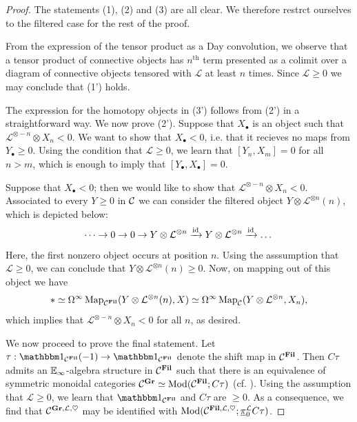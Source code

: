 %

\begin{proof}
  The statements (1), (2) and (3) are all clear. We therefore restrct ourselves to the filtered case for the rest of the proof.

  From the expression of the tensor product as a Day convolution, we observe that a tensor product of connective objects has $n^{\mathrm{th}}$ term presented as a colimit over a diagram of connective objects tensored with $\mathcal{L}$ at least $n$ times. Since $\mathcal{L} \geq 0$ we may conclude that (1') holds.

  The expression for the homotopy objects in (3') follows from (2') in a straightforward way.
  We now prove (2').
  Suppose that $X_\bullet$ is an object such that $\mathcal{L}^{\otimes -n} \otimes X_n < 0$.
  We want to show that $X_\bullet < 0$, i.e. that it recieves no maps from $Y_\bullet \geq 0$.
  Using the condition that $\mathcal{L} \geq 0$, we learn that $[Y_n, X_m] = 0$ for all $n > m$, which is enough to imply that $[Y_\bullet, X_\bullet] = 0$.

  Suppose that $X_\bullet < 0$; then we would like to show that $\mathcal{L}^{\otimes -n} \otimes X_n < 0$.
  Associated to every $Y \geq 0$ in $\mathcal{C}$ we can consider the filtered object $Y \otimes \mathcal{L}^{\otimes n}(n)$, which is depicted below:
  \[ \dots \to 0 \to 0 \to Y \otimes \mathcal{L} ^{\otimes n} \xrightarrow{\mathrm{id}} Y \otimes \mathcal{L} ^{\otimes n} \xrightarrow{\mathrm{id}} \dots \]
Here, the first nonzero object occurs at position $n$.
  Using the asssumption that $\mathcal{L} \geq 0$, we can conclude that $Y \otimes \mathcal{L}^{\otimes n}(n) \geq 0$. Now, on mapping out of this object we have
  \[ * \simeq \Omega^{\infty} \operatorname{\mathrm{Map}}_{\mathcal{C}^{\operatorname{\mathbf{Fil}}}} ( Y \otimes \mathcal{L}^{\otimes n}(n), X) \simeq \Omega^\infty \operatorname{\mathrm{Map}}_{\mathcal{C}} ( Y \otimes \mathcal{L}^{\otimes n}, X_n), \]
  which implies that $\mathcal{L}^{\otimes -n} \otimes X_n < 0$ for all $n$, as desired.

  We now proceed to prove the final statement.
  Let $\tau : \o_{\CC^{\Fil}} (-1) \to \o_{\CC^{\Fil}}$ denote the shift map in $\mathcal{C}^{\operatorname{\mathbf{Fil}}}$. Then $C\tau$ admits an $\operatorname{\mathbb{E}}_\infty$-algebra structure in $\mathcal{C}^{\operatorname{\mathbf{Fil}}}$ such that there is an equivalence of symmetric monoidal categories $\mathcal{C}^{\operatorname{\mathbf{Gr}}} \simeq \mathrm{Mod}(\mathcal{C}^{\operatorname{\mathbf{Fil}}}; C\tau)$ (cf. ). Using the assumption that $\mathcal{L} \geq 0$, we learn that $\o_{\CC^{\Fil}}$ and $C\tau$ are $\geq 0$. As a consequence, we find that $\mathcal{C}^{\operatorname{\mathbf{Gr}}, \mathcal{L}, \heartsuit}$ may be identified with $\mathrm{Mod}(\mathcal{C}^{\operatorname{\mathbf{Fil}}, \mathcal{L}, \heartsuit}; \underline{\pi}_0 ^{\mathcal{L}} C\tau)$.


\end{proof}
